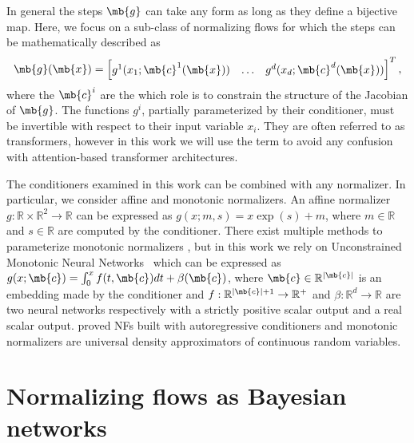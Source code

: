 In general the steps $\mb{g}$ can take any form as long as they define a bijective map. Here, we focus  on a sub-class of normalizing flows for which the steps can be mathematically described as
\begin{align}
    \mb{g}(\mb{x}) = \begin{bmatrix}
g^1(x_{1}; \mb{c}^1(\mb{x}))  & \hdots & g^d(x_{d}; \mb{c}^d(\mb{x}))
\end{bmatrix}^T,\label{eq:gnf}
\end{align}
where the $\mb{c}^i$ are the  which role is to constrain the structure of the Jacobian of $\mb{g}$.
The functions $g^i$, partially parameterized by their conditioner, must be invertible with respect to their input variable $x_i$. They are often referred to as transformers, however in this work we will use the term  to avoid any confusion with attention-based transformer architectures.


The conditioners examined in this work can be combined with any normalizer. In particular, we consider affine and monotonic normalizers. An affine normalizer $g: \mathbb{R} \times \mathbb{R}^2 \rightarrow \mathbb{R}$ can be expressed as
$g(x;m, s) = x\exp(s) + m$, where $m \in \mathbb{R}$ and $s \in \mathbb{R}$ are computed by the conditioner. There exist multiple methods to parameterize monotonic normalizers \citep{huang2018neural, de2020block, neural-spline-flows, sos}, but in this work we rely on Unconstrained Monotonic Neural Networks~\citep[UMNNs, ][]{UMNN} which can be expressed as
$g(x; \mb{c}) = \int^x_0 f(t, \mb{c}) dt + \beta(\mb{c})$, where $\mb{c} \in \mathbb{R}^{|\mb{c}|}$ is an embedding made by the conditioner and $f: \mathbb{R}^{|\mb{c}| + 1} \rightarrow \mathbb{R}^+$ and  $\beta: \mathbb{R}^d\rightarrow\mathbb{R}$ are two neural networks respectively with a strictly positive scalar output and a real scalar output. \cite{huang2018neural} proved NFs built with autoregressive conditioners and monotonic normalizers are universal density approximators of continuous random variables.



\section{Normalizing flows as Bayesian networks} \label{sec:NF-BN}

